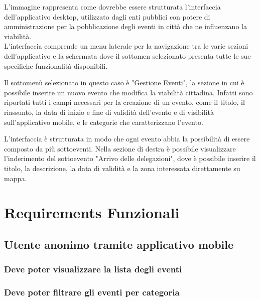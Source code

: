 \documentclass{article}
\begin{document}
L'immagine rappresenta come dovrebbe essere strutturata l'interfaccia dell'applicativo desktop, utilizzato dagli enti pubblici con potere di amministrazione per la pobblicazione degli eventi in città che ne influenzano la viabilità.\\
L'interfaccia comprende un menu laterale per la navigazione tra le varie sezioni dell'applicativo e la schermata dove il sottomen selezionato presenta tutte le sue specifiche funzionalità disponibili.

Il sottomenù selezionato in questo caso è "Gestione Eventi", la sezione in cui è possibile inserire un nuovo evento che modifica la viabilità cittadina. Infatti sono riportati tutti i campi necessari per la creazione di un evento, come il titolo, il riassunto, la data di inizio e fine di validità dell'evento e di visibilità sull'applicativo mobile, e le categorie che caratterizzano l'evento.

L'interfaccia è strutturata in modo che ogni evento abbia la possibilità di essere composto da più sottoeventi. Nella sezione di destra è possibile visualizzare l'inderimento del sottoevento "Arrivo delle delegazioni", dove è possibile inserire il titolo, la descrizione, la data di validità e la zona interessata direttamente su mappa.\\

\clearpage

\section{Requirements Funzionali}

\subsection{Utente anonimo tramite applicativo mobile}

\subsubsection{Deve poter visualizzare la lista degli eventi}

\subsubsection{Deve poter filtrare gli eventi per categoria}
\end{document}

